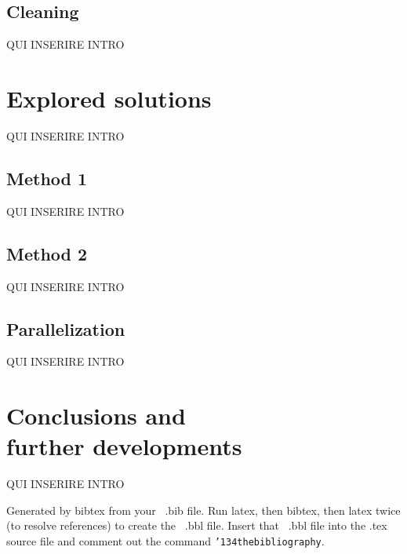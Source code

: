 \documentclass{acm_proc_article-sp-sigmod09}
\begin{document}
\subsection{Cleaning}
QUI INSERIRE INTRO

\section{Explored solutions}
QUI INSERIRE INTRO

\subsection{Method 1}
QUI INSERIRE INTRO

\subsection{Method 2}
QUI INSERIRE INTRO

\subsection{Parallelization}
QUI INSERIRE INTRO

\section{Conclusions and \\further developments}
QUI INSERIRE INTRO



Generated by bibtex from your ~.bib file.  Run latex,
then bibtex, then latex twice (to resolve references)
to create the ~.bbl file.  Insert that ~.bbl file into
the .tex source file and comment out
the command \texttt{{\char'134}thebibliography}.
\end{document}
